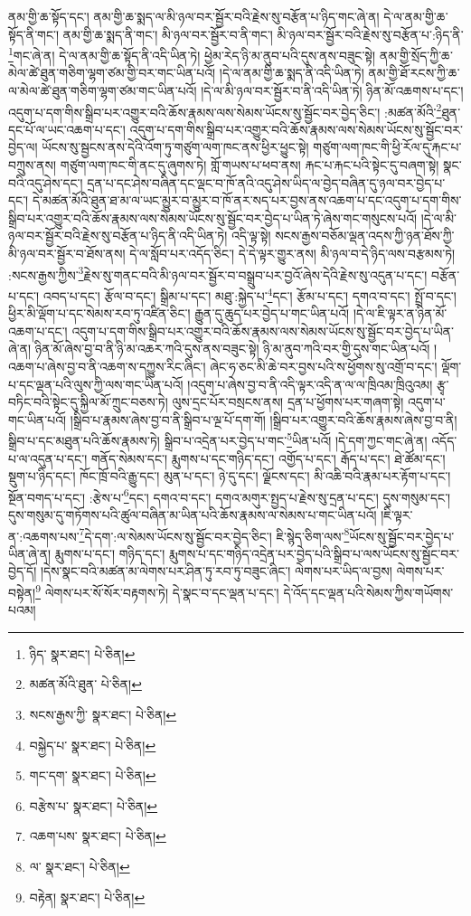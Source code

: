 ནམ་གྱི་ཆ་སྟོད་དང་། ནམ་གྱི་ཆ་སྨད་ལ་མི་ཉལ་བར་སྦྱོར་བའི་རྗེས་སུ་བརྩོན་པ་ཉིད་གང་ཞེ་ན། དེ་ལ་ནམ་གྱི་ཆ་སྟོད་ནི་གང་། ནམ་གྱི་ཆ་སྨད་ནི་གང་། མི་ཉལ་བར་སྦྱོར་བ་ནི་གང་། མི་ཉལ་བར་སྦྱོར་བའི་རྗེས་སུ་བརྩོན་པ་:ཉིད་ནི་\footnote{ཉིད་  སྣར་ཐང་།  པེ་ཅིན། }གང་ཞེ་ན། དེ་ལ་ནམ་གྱི་ཆ་སྟོད་ནི་འདི་ཡིན་ཏེ། ཕྱེམ་རེད་ཉི་མ་ནུབ་པའི་དུས་ནས་བཟུང་སྟེ། ནམ་གྱི་སྲོད་ཀྱི་ཆ་མེལ་ཚེ་ཐུན་གཅིག་ལྷག་ཙམ་གྱི་བར་གང་ཡིན་པའོ། །དེ་ལ་ནམ་གྱི་ཆ་སྨད་ནི་འདི་ཡིན་ཏེ། ནམ་གྱི་ཐོ་རངས་ཀྱི་ཆ་ལ་མེལ་ཚེ་ཐུན་གཅིག་ལྷག་ཙམ་གང་ཡིན་པའོ། །དེ་ལ་མི་ཉལ་བར་སྦྱོར་བ་ནི་འདི་ཡིན་ཏེ། ཉིན་མོ་འཆགས་པ་དང་། འདུག་པ་དག་གིས་སྒྲིབ་པར་འགྱུར་བའི་ཆོས་རྣམས་ལས་སེམས་ཡོངས་སུ་སྦྱོང་བར་བྱེད་ཅིང་། :མཚན་མོའི་\footnote{མཚན་མོའི་ཐུན་  པེ་ཅིན། }ཐུན་དང་པོ་ལ་ཡང་འཆག་པ་དང་། འདུག་པ་དག་གིས་སྒྲིབ་པར་འགྱུར་བའི་ཆོས་རྣམས་ལས་སེམས་ཡོངས་སུ་སྦྱོང་བར་བྱེད་ལ། ཡོངས་སུ་སྦྱངས་ནས་དེའི་འོག་ཏུ་གཙུག་ལག་ཁང་ནས་ཕྱིར་ཕྱུང་སྟེ། གཙུག་ལག་ཁང་གི་ཕྱི་རོལ་དུ་རྐང་པ་བཀྲུས་ནས། གཙུག་ལག་ཁང་གི་ནང་དུ་ཞུགས་ཏེ། གློ་གཡས་པ་ཕབ་ནས། རྐང་པ་རྐང་པའི་སྟེང་དུ་བཞག་སྟེ། སྣང་བའི་འདུ་ཤེས་དང་། དྲན་པ་དང་ཤེས་བཞིན་དང་ལྡང་བ་ཁོ་ནའི་འདུ་ཤེས་ཡིད་ལ་བྱེད་བཞིན་དུ་ཉལ་བར་བྱེད་པ་དང་། དེ་མཚན་མོའི་ཐུན་ཐ་མ་ལ་ཡང་མྱུར་བ་མྱུར་བ་ཁོ་ནར་སད་པར་བྱས་ནས་འཆག་པ་དང་འདུག་པ་དག་གིས་སྒྲིབ་པར་འགྱུར་བའི་ཆོས་རྣམས་ལས་སེམས་ཡོངས་སུ་སྦྱོང་བར་བྱེད་པ་ཡིན་ཏེ་ཞེས་གང་གསུངས་པའོ། །དེ་ལ་མི་ཉལ་བར་སྦྱོར་བའི་རྗེས་སུ་བརྩོན་པ་ཉིད་ནི་འདི་ཡིན་ཏེ། འདི་ལྟ་སྟེ། སངས་རྒྱས་བཅོམ་ལྡན་འདས་ཀྱི་ཉན་ཐོས་ཀྱི་མི་ཉལ་བར་སྦྱོར་བ་ཐོས་ནས། དེ་ལ་སློབ་པར་འདོད་ཅིང་། དེ་དེ་ལྟར་གྱུར་ནས། མི་ཉལ་བ་དེ་ཉིད་ལས་བརྩམས་ཏེ། :སངས་རྒྱས་ཀྱིས་\footnote{སངས་རྒྱས་ཀྱི་  སྣར་ཐང་།  པེ་ཅིན། }རྗེས་སུ་གནང་བའི་མི་ཉལ་བར་སྦྱོར་བ་བསྒྲུབ་པར་བྱའོ་ཞེས་དེའི་རྗེས་སུ་འདུན་པ་དང་། བརྩོན་པ་དང་། འབད་པ་དང་། རྩོལ་བ་དང་། སྒྲིམ་པ་དང་། མཐུ་:སྐྱེད་པ་\footnote{བསྐྱེད་པ་  སྣར་ཐང་།  པེ་ཅིན། }དང་། རྩོམ་པ་དང་། དགའ་བ་དང་། སྤྲོ་བ་དང་། ཕྱིར་མི་ལྡོག་པ་དང་སེམས་རབ་ཏུ་འཛིན་ཅིང་། རྒྱུན་དུ་ཆུད་པར་བྱེད་པ་གང་ཡིན་པའོ། །དེ་ལ་ཇི་ལྟར་ན་ཉིན་མོ་འཆག་པ་དང་། འདུག་པ་དག་གིས་སྒྲིབ་པར་འགྱུར་བའི་ཆོས་རྣམས་ལས་སེམས་ཡོངས་སུ་སྦྱོང་བར་བྱེད་པ་ཡིན་ཞེ་ན། ཉིན་མོ་ཞེས་བྱ་བ་ནི་ཉི་མ་འཆར་ཀའི་དུས་ནས་བཟུང་སྟེ། ཉི་མ་ནུབ་ཀའི་བར་གྱི་དུས་གང་ཡིན་པའོ། །འཆག་པ་ཞེས་བྱ་བ་ནི་འཆག་ས་དཀྱུས་རིང་ཞིང་། ཞེང་ཧ་ཅང་མི་ཆེ་བར་བྱས་པའི་ས་ཕྱོགས་སུ་འགྲོ་བ་དང་། ལྡོག་པ་དང་ལྡན་པའི་ལུས་ཀྱི་ལས་གང་ཡིན་པའོ། །འདུག་པ་ཞེས་བྱ་བ་ནི་འདི་ལྟར་འདི་ན་ལ་ལ་ཁྲིའམ་ཁྲིའུའམ། རྩྭ་བཏིང་བའི་སྟེང་དུ་སྐྱིལ་མོ་ཀྲུང་བཅས་ཏེ། ལུས་དྲང་པོར་བསྲངས་ནས། དྲན་པ་ཕྱོགས་པར་གཞག་སྟེ། འདུག་པ་གང་ཡིན་པའོ། །སྒྲིབ་པ་རྣམས་ཞེས་བྱ་བ་ནི་སྒྲིབ་པ་ལྔ་པོ་དག་གོ། །སྒྲིབ་པར་འགྱུར་བའི་ཆོས་རྣམས་ཞེས་བྱ་བ་ནི། སྒྲིབ་པ་དང་མཐུན་པའི་ཆོས་རྣམས་ཏེ། སྒྲིབ་པ་འདྲེན་པར་བྱེད་པ་གང་\footnote{གང་དག་  སྣར་ཐང་།  པེ་ཅིན། }ཡིན་པའོ། །དེ་དག་ཀྱང་གང་ཞེ་ན། འདོད་པ་ལ་འདུན་པ་དང་། གནོད་སེམས་དང་། རྨུགས་པ་དང་གཉིད་དང་། འགྱོད་པ་དང་། རྒོད་པ་དང་། ཐེ་ཚོམ་དང་། སྡུག་པ་ཉིད་དང་། ཁོང་ཁྲོ་བའི་རྒྱུ་དང་། མུན་པ་དང་། ཉེ་དུ་དང་། ལྗོངས་དང་། མི་འཆི་བའི་རྣམ་པར་རྟོག་པ་དང་། སྔོན་བགད་པ་དང་། :རྩེས་པ་\footnote{བརྩེས་པ་  སྣར་ཐང་།  པེ་ཅིན། }དང་། དགའ་བ་དང་། དགའ་མགུར་སྤྱད་པ་རྗེས་སུ་དྲན་པ་དང་། དུས་གསུམ་དང་། དུས་གསུམ་དུ་གཏོགས་པའི་ཚུལ་བཞིན་མ་ཡིན་པའི་ཆོས་རྣམས་ལ་སེམས་པ་གང་ཡིན་པའོ། །ཇི་ལྟར་ན་:འཆགས་པས་\footnote{འཆག་པས་  སྣར་ཐང་།  པེ་ཅིན། }དེ་དག་:ལ་སེམས་ཡོངས་སུ་སྦྱོང་བར་བྱེད་ཅིང་། ཇི་སྙེད་ཅིག་ལས་\footnote{ལ་  སྣར་ཐང་།  པེ་ཅིན། }ཡོངས་སུ་སྦྱོང་བར་བྱེད་པ་ཡིན་ཞེ་ན། རྨུགས་པ་དང་། གཉིད་དང་། རྨུགས་པ་དང་གཉིད་འདྲེན་པར་བྱེད་པའི་སྒྲིབ་པ་ལས་ཡོངས་སུ་སྦྱོང་བར་བྱེད་དོ། །དེས་སྣང་བའི་མཚན་མ་ལེགས་པར་ཤིན་ཏུ་རབ་ཏུ་བཟུང་ཞིང་། ལེགས་པར་ཡིད་ལ་བྱས། ལེགས་པར་བསྟེན།\footnote{བརྟེན།  སྣར་ཐང་།  པེ་ཅིན། } ལེགས་པར་སོ་སོར་བརྟགས་ཏེ། དེ་སྣང་བ་དང་ལྡན་པ་དང་། དེ་འོད་དང་ལྡན་པའི་སེམས་ཀྱིས་གཡོགས་པའམ། 